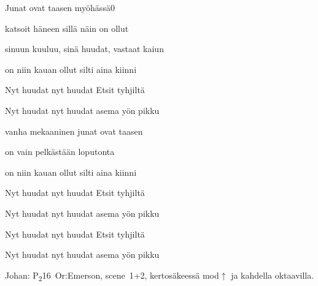 \documentclass[12pt,a4paper]{article}
\begin{document}
\thispagestyle{empty}
\begin{mysong}{Junat ovat taasen myöhässä}{0}


\begin{SBVerse}
   katsoit häneen sillä   näin on
  ollut 

   sinuun kuuluu, sinä   huudat, vastaat
  kaiun 

   on niin kauan ollut   silti aina
  kiinni 
\end{SBVerse}

\begin{SBChorus}
  Nyt huudat  nyt huudat  Etsit
   tyhjiltä 

  Nyt huudat  nyt huudat 
  asema yön pikku
\end{SBChorus}


\begin{SBVerse}
   vanha mekaaninen   junat ovat
  taasen 

   on vain pelkästään   loputonta

   on niin kauan ollut   silti aina
  kiinni 
\end{SBVerse}

\begin{SBChorus}
  Nyt huudat  nyt huudat  Etsit
   tyhjiltä 

  Nyt huudat  nyt huudat 
  asema yön pikku
\end{SBChorus}


\begin{SBChorus}
  Nyt huudat  nyt huudat  Etsit
   tyhjiltä 

  Nyt huudat  nyt huudat 
  asema yön pikku
\end{SBChorus}

{\SBLyricNoteFont Johan: P\textsubscript{2}16~Or:Emerson, scene~1+2,
kertosäkeessä mod$\uparrow$ ja kahdella oktaavilla.}

\end{mysong}
\end{document}
